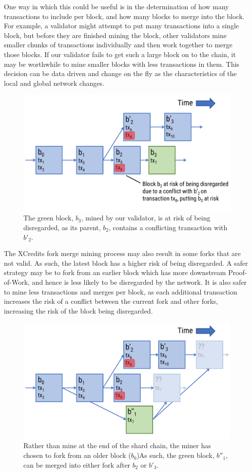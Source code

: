 \documentclass[a4paper,12pt]{article}
\begin{document}
One way in which this could be useful is in the determination of how many transactions to include per block, and how many blocks to merge into the block. For example, a validator might attempt to put many transactions into a single block, but before they are finished mining the block, other validators mine smaller chunks of transactions individually and then work together to merge those blocks. If our validator fails to get such a large block on to the chain, it may be worthwhile to mine smaller blocks with less transactions in them. This decision can be data driven and change on the fly as the characteristics of the local and global network changes. 

\begin{figure}[!htb]
  \centering
  \includegraphics[page=1,width=.75\textwidth]{risk-of-low-confirmation-endpoints} 
  \caption{The green block, $b_3$, mined by our validator, is at risk of being disregarded, as its parent, $b_2$, contains a conflicting transaction with $b'_2$. }
  \label{fig:low-confirmation-endpoints}
\end{figure}
\FloatBarrier

The XCredits fork merge mining process may also result in some forks that are not valid. As such, the latest block has a higher risk of being disregarded. A safer strategy may be to fork from an earlier block which has more downstream Proof-of-Work, and hence is less likely to be disregarded by the network. It is also safer to mine less transactions and merges per block, as each additional transaction increases the risk of a conflict between the current fork and other forks, increasing the risk of the block being disregarded.

\begin{figure}[!htb]
  \centering
  \includegraphics[page=1,width=.75\textwidth]{risk-of-low-confirmation-endpoints-solution} 
  \caption{Rather than mine at the end of the shard chain, the miner has chosen to fork from an older block ($b_0$)As such, the green block, $b''_1$, can be merged into either fork after $b_2$ or $b'_3$.}
  \label{fig:low-confirmation-endpoints-solution}
\end{figure}
\FloatBarrier
\end{document}
